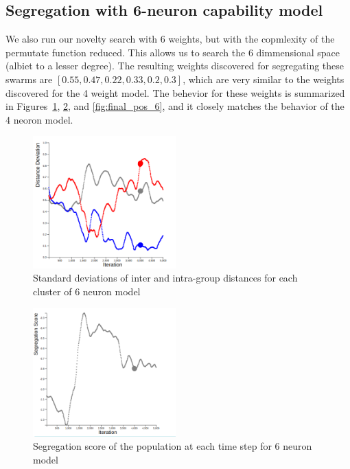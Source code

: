 \subsection{Segregation with 6-neuron capability model}
\label{sec:seg6}

We also run our novelty search with 6 weights, but with the copmlexity of the permutate function reduced. 
This allows us to search the 6 dimmensional space (albiet to a lesser degree). 
The resulting weights discovered for segregating these swarms are $[0.55, 0.47, 0.22, 0.33, 0.2, 0.3]$, which are very similar to the weights discovered for the 4 weight model.
The behevior for these weights is summarized in Figures~\ref{fig:final_dev_6}, \ref{fig:final_seg_6}, and \ref{fig:final_pos_6}, and it closely matches the behavior of the 4 neoron model. 

\begin{figure}
    \centering
    \includegraphics[width=5.5cm]{imgs/final_dev_6.png}
    \caption{Standard deviations of inter and intra-group distances for each cluster of 6 neuron model}
    \label{fig:final_dev_6}
\end{figure}

\begin{figure}
    \centering
    \includegraphics[width=5.5cm]{imgs/final_seg_6.png}
    \caption{Segregation score of the population at each time step for 6 neuron model}
    \label{fig:final_seg_6}
\end{figure}

